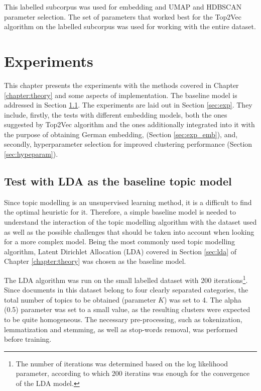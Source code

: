 \documentclass[fontsize=12pt,a4paper,twoside,openany]{scrbook}
\begin{document}
This labelled subcorpus was used for embedding and UMAP and HDBSCAN parameter selection. The set of parameters that worked best for the Top2Vec algorithm on the labelled subcorpus was used for working with the entire dataset.

\chapter{Experiments}
\label{chap:exp}

This chapter presents the experiments with the methods covered in Chapter \ref{chapter:theory} and some aspects of implementation. The baseline model is addressed in Section \ref{sec:lda_baseline}. The experiments are laid out in Section \ref{sec:exp}. They include, firstly, the tests with different embedding models, both the ones suggested by Top2Vec algorithm and the ones additionally integrated into it with the purpose of obtaining German embedding, (Section \ref{sec:exp_emb}), and, secondly, hyperparameter selection for improved clustering performance (Section \ref{sec:hypeparam}).

\section{Test with LDA as the baseline topic model}
\label{sec:lda_baseline}

Since topic modelling is an unsupervised learning method, it is a difficult to find the optimal heuristic for it. Therefore, a simple baseline model is needed to understand the interaction of the topic modelling algorithm with the dataset used as well as the possible challenges that should be taken into account when looking for a more complex model. Being the most commonly used topic modelling algorithm, Latent Dirichlet Allocation (LDA) covered in Section \ref{sec:lda} of Chapter \ref{chapter:theory} was chosen as the baseline model.

The LDA algorithm was run on the small labelled dataset with 200 iterations\footnote{The number of iterations was determined based on the log likelihood parameter, according to which 200 iteratins was enough for the convergence of the LDA model.}. Since documents in this dataset belong to four clearly separated categories, the total number of topics to be obtained (parameter \(K\)) was set to 4. The alpha (0.5) parameter was set to a small value, as the resulting clusters were expected to be quite homogeneous. The necessary pre-processing, such as tokenization, lemmatization and stemming, as well as stop-words removal, was performed before training.
\end{document}
